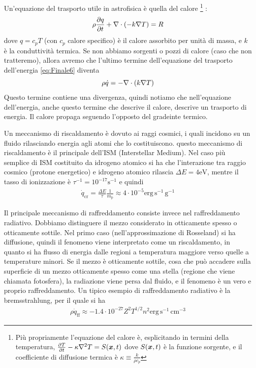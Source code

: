 Un'equazione del trasporto utile in astrofisica è quella del calore \footnote{Più propriamente l'equazione del calore è, esplicitando in termini della temperatura, $\frac{\partial T}{\partial t} - \kappa \nabla^2 T = S(\V{x},t)$ dove $S(\V{x},t)$ è la funzione sorgente, e il coefficiente di diffusione termica è $\kappa \equiv \frac{k}{\rho c_p}$} :
\begin{equation}
\rho \frac{\partial q}{\partial t} + \V{\nabla}\cdot (- k \nabla T) = R 
\end{equation}
dove $q=c_p T$ (con $c_p$ calore specifico) è il calore assorbito per unità di massa, e
 $k$ è la conduttività termica. Se non abbiamo sorgenti o pozzi di calore (caso che non tratteremo), allora avremo che l'ultimo termine dell'equazione del trasporto dell'energia \ref{eq:Finale6} diventa
\begin{equation}
\rho \dot{q}=-\V{\nabla} \cdot (k \V{\nabla} T)
\end{equation}
Questo termine contiene una divergenza, quindi notiamo che nell'equazione dell'energia, anche questo termine che descrive il calore, descrive un trasporto di energia. Il calore propaga seguendo l'opposto del gradeinte termico.

Un meccanismo di riscaldamento è dovuto ai raggi cosmici, i quali incidono su un fluido rilasciando energia agli atomi che lo costituiscono. questo meccanismo di riscaldamento è il principale dell'ISM (Interstellar Medium). Nel caso più semplice di ISM costituito da idrogeno atomico si ha che l'interazione tra raggio cosmico (protone energetico) e idrogeno atomico rilascia $\Delta E = 4 \mathrm{eV}$, mentre il tasso di ionizzazione è $\tau^{-1} = 10^{-17} \mathrm{s}^{-1}$ e quindi 
\begin{align*}
\dot{q}_\mathrm{cr}= \frac{\Delta E}{\tau} \frac{1}{m_\mathrm{p}} \approx 4\cdot 10^{-5} \mathrm{erg}\, \mathrm{s}^{-1} \, \mathrm{g}^{-1}
\end{align*}

Il principale meccanismo di raffreddamento consiste invece nel raffreddamento radiativo. Dobbiamo distinguere il mezzo considerato in otticamente spesso o otticamente sottile. Nel primo caso (nell'approssimazione di Rosseland) si ha diffusione, quindi il fenomeno viene interpretato come un riscaldamento, in quanto si ha flusso di energia dalle regioni a temperatura maggiore verso quelle a temperature minori. Se il mezzo è otticamente sottile, cosa che può accadere sulla superficie di un mezzo otticamente spesso come una stella (regione che viene chiamata fotosfera), la radiazione viene persa dal fluido, e il fenomeno è un vero e proprio raffreddamento. Un tipico esempio di raffreddamento radiativo è la bremsstrahlung, per il quale si ha
\begin{align*}
\rho \dot{q}_\mathrm{ff} \approx -1.4 \cdot 10^{-27} Z^2 T^{1/2} n^2 \mathrm{erg}\, \mathrm{s}^{-1} \, \mathrm{cm}^{-3}
\end{align*}

